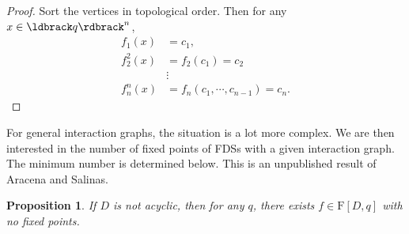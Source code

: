 \documentclass[a4paper, 11pt]{book}
\numberwithin{equation}{section}
\theoremstyle{plain}
\newtheorem{proposition}[equation]	{Proposition}
\newcommand{\functions}{\mathrm{F}}
\renewcommand{\(}{\ldbrack}
\renewcommand{\)}{\rdbrack}
\begin{document}
\begin{proof}[Proof]
Sort the vertices in topological order. Then for any $x \in \(q\)^n$,
\begin{align*}
	f_1(x) &= c_1,\\
	f_2^2(x) &= f_2(c_1) = c_2\\
	&\vdots\\
	f_n^n(x) &= f_n(c_1, \cdots, c_{n-1}) = c_n.
\end{align*}
\end{proof}


For general interaction graphs, the situation is a lot more complex. We are then interested in the number of fixed points of FDSs with a given interaction graph. The minimum number is determined below. This is an unpublished result of Aracena and Salinas.


\begin{proposition} \label{prop:no_fixed_points_cyclic}
If $D$ is not acyclic, then for any $q$, there exists $f \in \functions[D,q]$ with no fixed points.
\end{proposition}
\end{document}
